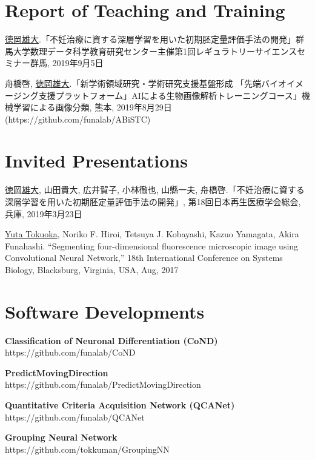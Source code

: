 \documentclass[letterpaper]{article}
\renewenvironment{itemize}{
  \begin{list}{}{
    \setlength{\leftmargin}{1.5em}
  }
}{
  \end{list}
}
\begin{document}
\section*{\bf Report of Teaching and Training}
\vspace{-0.6cm}
\hrulefill

\begin{itemize}
 \item \underline{徳岡雄大}.「不妊治療に資する深層学習を用いた初期胚定量評価手法の開発」群馬大学数理データ科学教育研究センター主催第1回レギュラトリーサイエンスセミナー群馬, 2019年9月5日
 \item 舟橋啓, \underline{徳岡雄大}.「新学術領域研究・学術研究支援基盤形成 「先端バイオイメージング支援プラットフォーム」AIによる生物画像解析トレーニングコース」機械学習による画像分類, 熊本, 2019年8月29日 \\ (https://github.com/funalab/ABiSTC)
       \\
\end{itemize}


\section*{\bf Invited Presentations}
\vspace{-0.6cm}
\hrulefill

\begin{itemize}
 \item \underline{徳岡雄大}, 山田貴大, 広井賀子, 小林徹也, 山縣一夫, 舟橋啓.「不妊治療に資する深層学習を用いた初期胚定量評価手法の開発」, 第18回日本再生医療学会総会, 兵庫, 2019年3月23日
 \item \underline{Yuta Tokuoka}, Noriko F. Hiroi, Tetsuya J. Kobayashi, Kazuo Yamagata, Akira Funahashi. ``Segmenting four-dimensional fluorescence microscopic image using Convolutional Neural Network,'' 18th International Conference on Systems Biology, Blacksburg, Virginia, USA, Aug, 2017
       \\
\end{itemize}


\section*{\bf Software Developments}
\vspace{-0.6cm}
\hrulefill

\begin{itemize}
 \item {\bf Classification of Neuronal Differentiation (CoND)} \\
       https://github.com/funalab/CoND
 \item {\bf PredictMovingDirection} \\
       https://github.com/funalab/PredictMovingDirection
 \item {\bf Quantitative Criteria Acquisition Network (QCANet)} \\
       https://github.com/funalab/QCANet
 \item {\bf Grouping Neural Network} \\
       https://github.com/tokkuman/GroupingNN
       \\
\end{itemize}
\end{document}
